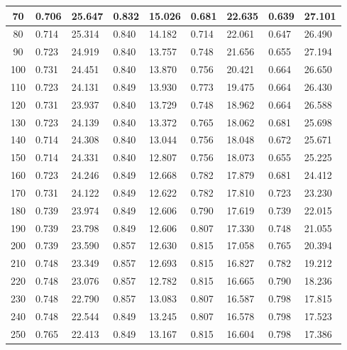 \documentclass{report}
\begin{document}
\begin{minipage}{\textwidth}
\begin{longtable}{|c|l|l|l|l|l|l|l|l|}
                     70 & 0.706 & 25.647 & 0.832 & 15.026 & 0.681 & 22.635 & 0.639 & 27.101 \\ \hline
                     80 & 0.714 & 25.314 & 0.840 & 14.182 & 0.714 & 22.061 & 0.647 & 26.490 \\ \hline
                     90 & 0.723 & 24.919 & 0.840 & 13.757 & 0.748 & 21.656 & 0.655 & 27.194 \\ \hline
                     100 & 0.731 & 24.451 & 0.840 & 13.870 & 0.756 & 20.421 & 0.664 & 26.650 \\ \hline
                     110 & 0.723 & 24.131 & 0.849 & 13.930 & 0.773 & 19.475 & 0.664 & 26.430 \\ \hline
                     120 & 0.731 & 23.937 & 0.840 & 13.729 & 0.748 & 18.962 & 0.664 & 26.588 \\ \hline
                     130 & 0.723 & 24.139 & 0.840 & 13.372 & 0.765 & 18.062 & 0.681 & 25.698 \\ \hline
                     140 & 0.714 & 24.308 & 0.840 & 13.044 & 0.756 & 18.048 & 0.672 & 25.671 \\ \hline
                     150 & 0.714 & 24.331 & 0.840 & 12.807 & 0.756 & 18.073 & 0.655 & 25.225 \\ \hline
                     160 & 0.723 & 24.246 & 0.849 & 12.668 & 0.782 & 17.879 & 0.681 & 24.412 \\ \hline
                     170 & 0.731 & 24.122 & 0.849 & 12.622 & 0.782 & 17.810 & 0.723 & 23.230 \\ \hline
                     180 & 0.739 & 23.974 & 0.849 & 12.606 & 0.790 & 17.619 & 0.739 & 22.015 \\ \hline
                     190 & 0.739 & 23.798 & 0.849 & 12.606 & 0.807 & 17.330 & 0.748 & 21.055 \\ \hline
                     200 & 0.739 & 23.590 & 0.857 & 12.630 & 0.815 & 17.058 & 0.765 & 20.394 \\ \hline
                     210 & 0.748 & 23.349 & 0.857 & 12.693 & 0.815 & 16.827 & 0.782 & 19.212 \\ \hline
                     220 & 0.748 & 23.076 & 0.857 & 12.782 & 0.815 & 16.665 & 0.790 & 18.236 \\ \hline
                     230 & 0.748 & 22.790 & 0.857 & 13.083 & 0.807 & 16.587 & 0.798 & 17.815 \\ \hline
                     240 & 0.748 & 22.544 & 0.849 & 13.245 & 0.807 & 16.578 & 0.798 & 17.523 \\ \hline
                     250 & 0.765 & 22.413 & 0.849 & 13.167 & 0.815 & 16.604 & 0.798 & 17.386 \\ \hline

\end{longtable}
\end{minipage}
\end{document}
